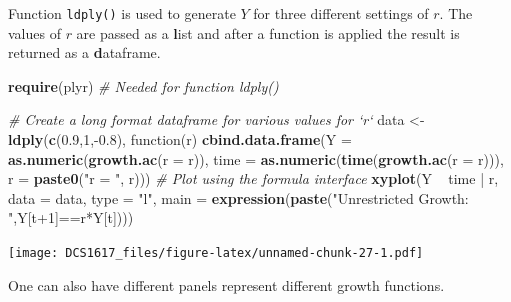\documentclass[]{book}
\newenvironment{Shaded}{\begin{snugshade}}{\end{snugshade}}
\newcommand{\KeywordTok}[1]{\textcolor[rgb]{0.13,0.29,0.53}{\textbf{{#1}}}}
\newcommand{\DataTypeTok}[1]{\textcolor[rgb]{0.13,0.29,0.53}{{#1}}}
\newcommand{\DecValTok}[1]{\textcolor[rgb]{0.00,0.00,0.81}{{#1}}}
\newcommand{\FloatTok}[1]{\textcolor[rgb]{0.00,0.00,0.81}{{#1}}}
\newcommand{\StringTok}[1]{\textcolor[rgb]{0.31,0.60,0.02}{{#1}}}
\newcommand{\CommentTok}[1]{\textcolor[rgb]{0.56,0.35,0.01}{\textit{{#1}}}}
\newcommand{\NormalTok}[1]{{#1}}
\begin{document}
Function \texttt{ldply()} is used to generate \(Y\) for three different
settings of \(r\). The values of \(r\) are passed as a \textbf{l}ist and
after a function is applied the result is returned as a
\textbf{d}ataframe.

\begin{Shaded}
\begin{Highlighting}[]
\KeywordTok{require}\NormalTok{(plyr)          }\CommentTok{# Needed for function ldply()}

\CommentTok{# Create a long format dataframe for various values for `r`}
\NormalTok{data <-}\StringTok{ }\KeywordTok{ldply}\NormalTok{(}\KeywordTok{c}\NormalTok{(}\FloatTok{0.9}\NormalTok{,}\DecValTok{1}\NormalTok{,-}\FloatTok{0.8}\NormalTok{), function(r) }\KeywordTok{cbind.data.frame}\NormalTok{(}\DataTypeTok{Y    =} \KeywordTok{as.numeric}\NormalTok{(}\KeywordTok{growth.ac}\NormalTok{(}\DataTypeTok{r =} \NormalTok{r)),}
                                                          \DataTypeTok{time =} \KeywordTok{as.numeric}\NormalTok{(}\KeywordTok{time}\NormalTok{(}\KeywordTok{growth.ac}\NormalTok{(}\DataTypeTok{r =} \NormalTok{r))),}
                                                          \DataTypeTok{r    =} \KeywordTok{paste0}\NormalTok{(}\StringTok{"r = "}\NormalTok{, r)))}
\CommentTok{# Plot using the formula interface}
\KeywordTok{xyplot}\NormalTok{(Y ~}\StringTok{ }\NormalTok{time |}\StringTok{ }\NormalTok{r, }\DataTypeTok{data =} \NormalTok{data, }\DataTypeTok{type =} \StringTok{"l"}\NormalTok{, }\DataTypeTok{main =} \KeywordTok{expression}\NormalTok{(}\KeywordTok{paste}\NormalTok{(}\StringTok{"Unrestricted Growth: "}\NormalTok{,Y[t}\DecValTok{+1}\NormalTok{]==r*Y[t])))}
\end{Highlighting}
\end{Shaded}

\texttt{[image: DCS1617\_files/figure-latex/unnamed-chunk-27-1.pdf]}

One can also have different panels represent different growth functions.
\end{document}
